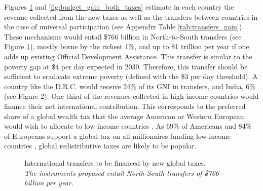 \documentclass[12pt,english]{article}
\begin{document}
\begin{bibunit}
Figures \ref{fig:gain_both_taxes} and \ref{fig:budget_gain_both_taxes} estimate in each country the revenue collected from the new taxes as well as the transfers between countries in the case of universal participation (see Appendix Table \ref{tab:transfers_gain}). These mechanisms would entail \$766 billion in North-to-South transfers (see Figure \ref{fig:gain_both_taxes}), mostly borne by the richest 1\%, and up to \$1 trillion per year if one adds up existing Official Development Assistance. This transfer is similar to the poverty gap at \$4 per day expected in 2030. Therefore, this transfer should be sufficient to eradicate extreme poverty (defined with the \$3 per day threshold). A country like the D.R.C. would receive 24\% of its GNI in transfers, and India, 6\% (see Figure 2). One third of the revenues collected in high-income countries would finance their net international contribution. This corresponds to the preferred share of a global wealth tax that the average American or Western European would wish to allocate to low-income countries \citep{fabre_majority_2025}. As 69\% of Americans and 84\% of Europeans support a global tax on all millionaires funding low-income countries \citep{fabre_majority_2025}, global redistributive taxes are likely to be popular.
 
\begin{figure}[h!] 
    \caption{International transfers to be financed by new global taxes. \\ \textit{The instruments proposed entail North-South transfers of \$766 billion per year.}}\label{fig:gain_both_taxes}
\end{figure}


\end{bibunit}
\end{document}
